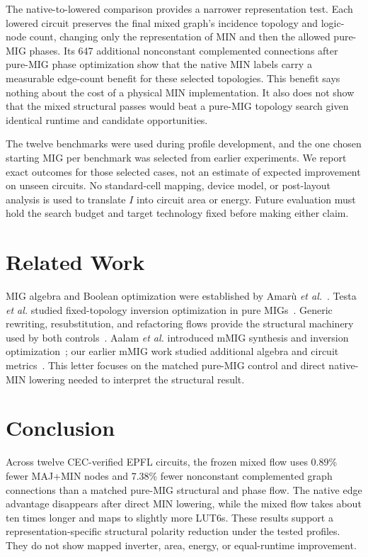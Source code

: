 \documentclass[10pt,journal]{IEEEtran}
\begin{document}
The native-to-lowered comparison provides a narrower representation
test. Each lowered circuit preserves the final mixed graph's incidence
topology and logic-node count, changing only the representation of
MIN and then the allowed pure-MIG phases. Its 647 additional
nonconstant complemented connections after pure-MIG phase optimization
show that the native MIN labels carry a measurable edge-count benefit
for these selected topologies. This benefit says nothing about the
cost of a physical MIN implementation. It also does not show that the
mixed structural passes would beat a pure-MIG topology search given
identical runtime and candidate opportunities.

The twelve benchmarks were used during profile development, and the
one chosen starting MIG per benchmark was selected from earlier
experiments. We report exact outcomes for those selected cases, not
an estimate of expected improvement on unseen circuits. No
standard-cell mapping, device model, or post-layout analysis is used
to translate $I$ into circuit area or energy. Future evaluation must
hold the search budget and target technology fixed before making
either claim.

\balance
\section{Related Work}
\label{sec:related}
MIG algebra and Boolean optimization were established by Amar\`u
\emph{et al.}~\cite{amaru2016mig}. Testa \emph{et al.} studied
fixed-topology inversion optimization in pure MIGs~\cite{testa2016inv}.
Generic rewriting, resubstitution, and refactoring flows provide the
structural machinery used by both controls~\cite{riener2019generic}.
Aalam \emph{et al.} introduced mMIG synthesis and inversion
optimization~\cite{aalam2021mmig}; our earlier mMIG work studied
additional algebra and circuit metrics~\cite{shende2025mmig}. This
letter focuses on the matched pure-MIG control and direct native-MIN
lowering needed to interpret the structural result.

\section{Conclusion}
\label{sec:conclusion}
Across twelve CEC-verified EPFL circuits, the frozen mixed flow uses
0.89\% fewer MAJ+MIN nodes and 7.38\% fewer nonconstant complemented
graph connections than a matched pure-MIG structural and phase flow.
The native edge advantage disappears after direct MIN lowering, while
the mixed flow takes about ten times longer and maps to slightly more
LUT6s. These results support a representation-specific structural
polarity reduction under the tested profiles. They do not show mapped
inverter, area, energy, or equal-runtime improvement.



\end{document}
